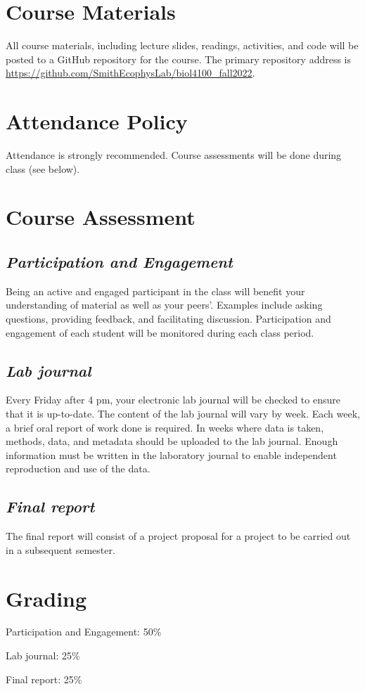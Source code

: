 \documentclass[12pt, notitlepage]{article}   	%
\begin{document}
{\section{Course Materials}
All course materials, including lecture slides, readings, activities, and code will be posted to a GitHub repository for the course.
The primary repository address is \url{https://github.com/SmithEcophysLab/biol4100_fall2022}.

\section{Attendance Policy}
Attendance is strongly recommended. Course assessments will be done during class (see below).

\section{Course Assessment}
\subsection{\textit{Participation and Engagement}}
Being an active and engaged participant in the class will benefit your understanding of material as well as your peers'. Examples include asking questions, providing feedback, and facilitating discussion. Participation and engagement of each student will be monitored during each class period.

\subsection{\textit{Lab journal}}
Every Friday after 4 pm, your electronic lab journal will be checked to ensure that it is up-to-date. The content of the lab journal will vary by week. Each week, a brief oral report of work done is required. In weeks where data is taken, methods, data, and metadata should be uploaded to the lab journal. Enough information must be written in the laboratory journal to enable independent reproduction and use of the data.

\subsection{\textit{Final report}}
The final report will consist of a project proposal for a project to be carried out in a subsequent semester.

\section{Grading}
Participation and Engagement: 50\% \par
Lab journal: 25\% \par
Final report: 25\% \par

}
\end{document}
